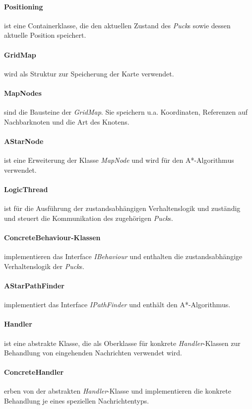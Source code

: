 \documentclass[10pt,a4paper]{article}
\begin{document}
			\paragraph*{\textbf{Positioning}} ist eine Containerklasse, die den aktuellen Zustand des \textit{Puck}s sowie dessen aktuelle Position
			speichert.
			\paragraph*{\textbf{GridMap}} wird als Struktur zur Speicherung der Karte verwendet.
			\paragraph*{\textbf{MapNode}s} sind die Bausteine der \textit{GridMap}. Sie speichern u.a. Koordinaten, Referenzen auf Nachbarknoten und die Art
			des Knotens.
			\paragraph*{\textbf{AStarNode}} ist eine Erweiterung der Klasse \textit{MapNode} und wird für den A*-Algorithmus verwendet.
			\paragraph*{\textbf{LogicThread}} ist für die Ausführung der zustandsabhängigen Verhaltenslogik und zuständig und steuert die Kommunikation des
			zugehörigen \textit{Puck}s.
			\paragraph*{\textbf{ConcreteBehaviour}-Klassen} implementieren das Interface \textit{IBehaviour} und enthalten die zustandsabhängige
			Verhaltenslogik der \textit{Puck}s.
			\paragraph*{\textbf{AStarPathFinder}} implementiert das Interface \textit{IPathFinder} und enthält den A*-Algorithmus.
			\paragraph*{\textbf{Handler}} ist eine abstrakte Klasse, die als Oberklasse für konkrete \textit{Handler}-Klassen zur Behandlung von eingehenden
			Nachrichten verwendet wird.
			\paragraph*{\textbf{ConcreteHandler}} erben von der abstrakten \textit{Handler}-Klasse und implementieren die konkrete Behandlung je eines
			speziellen Nachrichtentyps.
\end{document}

